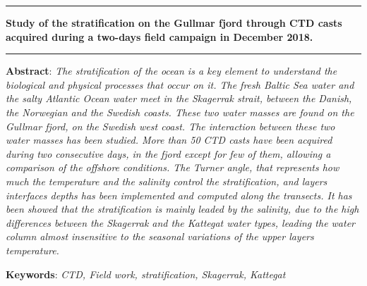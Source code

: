 \documentclass[12pt,a4paper]{article}
\begin{document}
\begin{center}
\vspace{.3cm}

\rule[5pt]{10cm}{0.5pt}
\vspace{10pt}

\textbf{\Large Study of the stratification on the Gullmar fjord through CTD casts
  acquired during a two-days field campaign in December 2018.}
\vspace{8pt}

\rule{10cm}{0.5pt}

\vspace{.3cm}

\parbox{15cm}{\small
  \textbf{Abstract}: \it
  The stratification of the ocean is a key element to understand the biological
  and physical processes that occur on it.
  The fresh Baltic Sea water and the salty Atlantic Ocean water meet
  in the Skagerrak strait, between the Danish, the Norwegian and the
  Swedish coasts.
  These two water masses are found on the Gullmar fjord, on the Swedish
  west coast.
  The interaction between these two water masses has been studied.
  More than 50 CTD casts have been acquired during two consecutive days,
  in the fjord except for few of them, allowing a comparison of the
  offshore conditions. The Turner angle, that represents how much the temperature
  and the salinity control the stratification, and layers interfaces depths
  has been implemented and computed along the transects.
  It has been showed that the stratification is mainly leaded by the salinity,
  due to the high differences between the Skagerrak and the Kattegat water types,
  leading the water column almost insensitive to the seasonal variations
  of the upper layers temperature.
} %

\vspace{0.5cm}

\parbox{15cm}{
\textbf{Keywords}: \it CTD, Field work, stratification, Skagerrak, Kattegat
} %

\end{center}

\newpage

\setcounter{page}{1}
\setlength\parindent{24pt}

\newpage

\tableofcontents

\newpage
\end{document}
